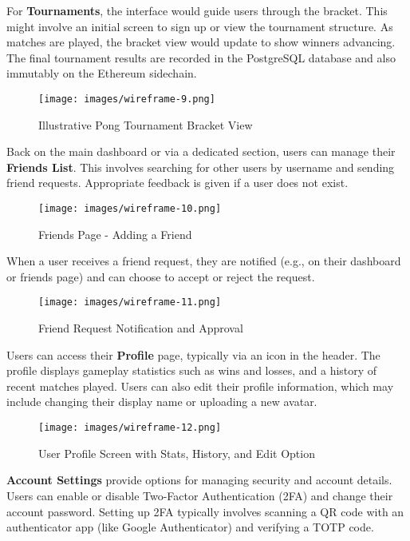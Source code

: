 For \textbf{Tournaments}, the interface would guide users through the bracket. This might involve an initial screen to sign up or view the tournament structure. As matches are played, the bracket view would update to show winners advancing. The final tournament results are recorded in the PostgreSQL database and also immutably on the Ethereum sidechain.

\begin{figure}[H]
    \texttt{[image: images/wireframe-9.png]}
    \caption{Illustrative Pong Tournament Bracket View}
    \label{fig:tournament}
\end{figure}

Back on the main dashboard or via a dedicated section, users can manage their \textbf{Friends List}. This involves searching for other users by username and sending friend requests. Appropriate feedback is given if a user does not exist.

\begin{figure}[H]
    \texttt{[image: images/wireframe-10.png]}
    \caption{Friends Page - Adding a Friend}
    \label{fig:friends-add}
\end{figure}

When a user receives a friend request, they are notified (e.g., on their dashboard or friends page) and can choose to accept or reject the request.

\begin{figure}[H]
    \texttt{[image: images/wireframe-11.png]}
    \caption{Friend Request Notification and Approval}
    \label{fig:friends-request}
\end{figure}

Users can access their \textbf{Profile} page, typically via an icon in the header. The profile displays gameplay statistics such as wins and losses, and a history of recent matches played. Users can also edit their profile information, which may include changing their display name or uploading a new avatar.

\begin{figure}[H]
    \texttt{[image: images/wireframe-12.png]}
    \caption{User Profile Screen with Stats, History, and Edit Option}
    \label{fig:profile-page}
\end{figure}

\textbf{Account Settings} provide options for managing security and account details. Users can enable or disable Two-Factor Authentication (2FA) and change their account password. Setting up 2FA typically involves scanning a QR code with an authenticator app (like Google Authenticator) and verifying a TOTP code.

